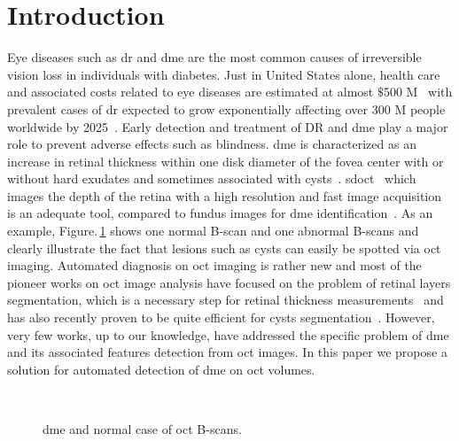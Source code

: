 \graphicspath{ {./content/intro/figures/} }

\section{Introduction}
\label{sec:intro}  %

Eye diseases such as \gls{dr} and \gls{dme} are the most common causes of irreversible vision loss in individuals with diabetes.
Just in United States alone, health care and associated costs related to eye diseases are estimated at almost $\$$500 M~\cite{Sharma2005} with prevalent cases of \gls{dr} expected to grow exponentially affecting over 300 M people worldwide by 2025~\cite{wild2004global}.
Early detection and treatment of DR and \gls{dme} play a major role to prevent adverse effects such as blindness.
\gls{dme} is characterized as an increase in retinal thickness within one disk diameter of the fovea center with or without hard exudates and sometimes associated with cysts~\cite{ETDRSG1985}.
\gls{sdoct}~\cite{Chen2005} which images the depth of the retina with a high resolution and fast image acquisition is an adequate tool, compared to fundus images for \gls{dme} identification~\cite{abramoff2010retinal,trucco2013validating,giancardo2011textureless}.
As an example, Figure.\,\ref{fig:fig1} shows one normal B-scan and one abnormal B-scans and clearly illustrate the fact that lesions such as cysts can easily be spotted via \gls{oct} imaging.
Automated diagnosis on \gls{oct} imaging is rather new and most of the pioneer works on \gls{oct} image analysis have focused on the problem of retinal layers segmentation, which is a necessary step for retinal thickness measurements~\cite{chiu2010automatic,garvin2009automated,garvin2008intraretinal} and has also recently proven to be quite efficient for cysts segmentation~\cite{oguz2016optimal}. 
However, very few works, up to our knowledge, have addressed the specific problem of \gls{dme} and its associated features detection from \gls{oct} images. 
In this paper we propose a solution for automated detection of \gls{dme} on \gls{oct} volumes.

\begin{figure}
\centering
        \
\caption{\gls{dme} and normal case of \gls{oct} B-scans.}
\label{fig:fig1}
\end{figure}

